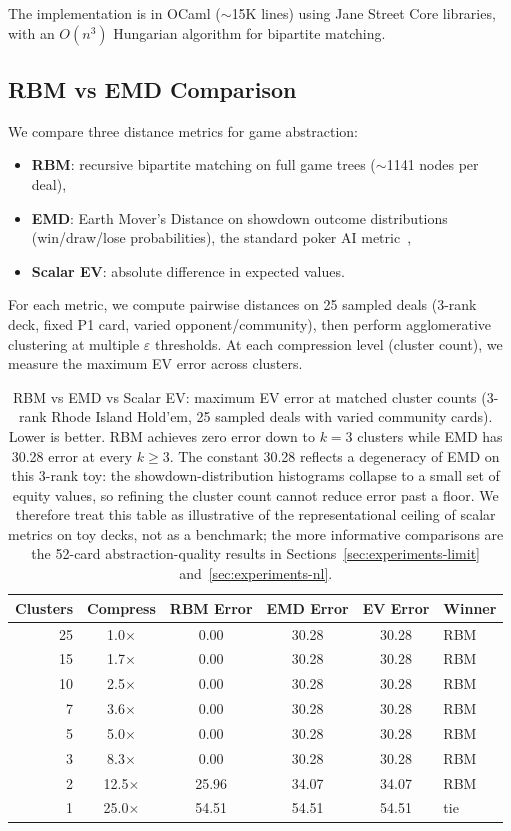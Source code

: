 \documentclass[11pt]{article}
\begin{document}
The implementation is in OCaml (${\sim}$15K lines) using Jane Street
Core libraries, with an $O(n^3)$ Hungarian algorithm for bipartite
matching.

\subsection{RBM vs EMD Comparison}

We compare three distance metrics for game abstraction:
\begin{itemize}[nosep]
  \item \textbf{RBM}: recursive bipartite matching on full game trees
    ($\sim$1141 nodes per deal),
  \item \textbf{EMD}: Earth Mover's Distance on showdown outcome
    distributions (win/draw/lose probabilities), the standard poker AI
    metric~\citep{gilpin2007potential},
  \item \textbf{Scalar EV}: absolute difference in expected values.
\end{itemize}

For each metric, we compute pairwise distances on 25 sampled deals
(3-rank deck, fixed P1 card, varied opponent/community), then perform
agglomerative clustering at multiple $\varepsilon$ thresholds. At each
compression level (cluster count), we measure the maximum EV error
across clusters.

\begin{table}[t]
\centering
\caption{RBM vs EMD vs Scalar EV: maximum EV error at matched cluster
counts (3-rank Rhode Island Hold'em, 25 sampled deals with varied
community cards). Lower is better. RBM achieves zero error down to
$k=3$ clusters while EMD has 30.28 error at every $k \ge 3$. The
constant 30.28 reflects a degeneracy of EMD on this 3-rank toy: the
showdown-distribution histograms collapse to a small set of equity
values, so refining the cluster count cannot reduce error past a
floor. We therefore treat this table as illustrative of the
representational ceiling of scalar metrics on toy decks, not as a
benchmark; the more informative comparisons are the 52-card
abstraction-quality results in Sections~\ref{sec:experiments-limit}
and~\ref{sec:experiments-nl}.}
\label{tab:rbm-vs-emd}
\begin{tabular}{rccccl}
\toprule
Clusters & Compress & RBM Error & EMD Error & EV Error & Winner \\
\midrule
25 & 1.0$\times$ & 0.00 & 30.28 & 30.28 & RBM \\
15 & 1.7$\times$ & 0.00 & 30.28 & 30.28 & RBM \\
10 & 2.5$\times$ & 0.00 & 30.28 & 30.28 & RBM \\
 7 & 3.6$\times$ & 0.00 & 30.28 & 30.28 & RBM \\
 5 & 5.0$\times$ & 0.00 & 30.28 & 30.28 & RBM \\
 3 & 8.3$\times$ & 0.00 & 30.28 & 30.28 & RBM \\
 2 & 12.5$\times$ & 25.96 & 34.07 & 34.07 & RBM \\
 1 & 25.0$\times$ & 54.51 & 54.51 & 54.51 & tie \\
\bottomrule
\end{tabular}
\end{table}
\end{document}
